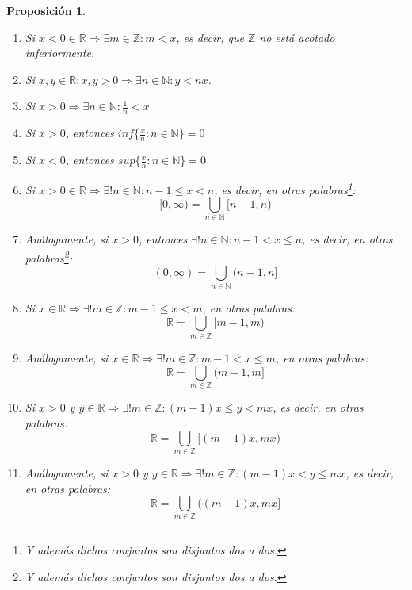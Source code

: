 \documentclass[10pt,a4paper,openright]{book}
\theoremstyle{break}
\newtheorem*{prop}{Proposición}
\begin{document}
\begin{prop}
\begin{enumerate}
\item Si $x<0\in \mathbb R\Rightarrow \exists m\in \mathbb Z: m<x$, es decir, que $\mathbb Z$ no está acotado inferiormente.
\item Si $x,y\in \mathbb R: x,y>0\Rightarrow \exists n \in \mathbb N : y<nx$.
\item Si $x>0\Rightarrow \exists n \in \mathbb N : \frac{1}{n}<x$
\item Si $x>0$, entonces $inf\{\frac{x}{n}: n\in \mathbb N\}=0$
\item Si $x<0$, entonces $sup\{\frac{x}{n}: n\in \mathbb N\}=0$
\item Si $x>0\in \mathbb R\Rightarrow \exists! n \in \mathbb N: n-1\leq x< n$, es decir, en otras palabras\footnote{Y además dichos conjuntos son disjuntos dos a dos.}:
$$[0,\infty)=\bigcup_{n\in \mathbb N}[n-1,n)$$
\item Análogamente, si $x>0$, entonces $\exists! n \in \mathbb N: n-1< x\leq n$, es decir, en otras palabras\footnote{Y además dichos conjuntos son disjuntos dos a dos.}:
$$(0,\infty)=\bigcup_{n\in \mathbb N}(n-1,n]$$
\item Si $x\in \mathbb R\Rightarrow \exists! m \in \mathbb Z: m-1\leq x < m$, en otras palabras:
$$\mathbb R =\bigcup_{m\in \mathbb Z}[m-1,m)$$
\item Análogamente, si $x\in \mathbb R\Rightarrow \exists! m \in \mathbb Z: m-1< x\leq m$, en otras palabras:
$$\mathbb R =\bigcup_{m\in \mathbb Z}(m-1,m]$$
\item Si $x>0$ y $y\in \mathbb R\Rightarrow \exists! m \in \mathbb Z: (m-1)x\leq y <mx$, es decir, en otras palabras:
$$\mathbb R= \bigcup_{m\in \mathbb Z}[(m-1)x, mx)$$
\item Análogamente, si $x>0$ y $y\in \mathbb R\Rightarrow \exists! m \in \mathbb Z: (m-1)x< y \leq mx$, es decir, en otras palabras:
$$\mathbb R= \bigcup_{m\in \mathbb Z}((m-1)x, mx]$$
\end{enumerate}
\end{prop}
\end{document}
